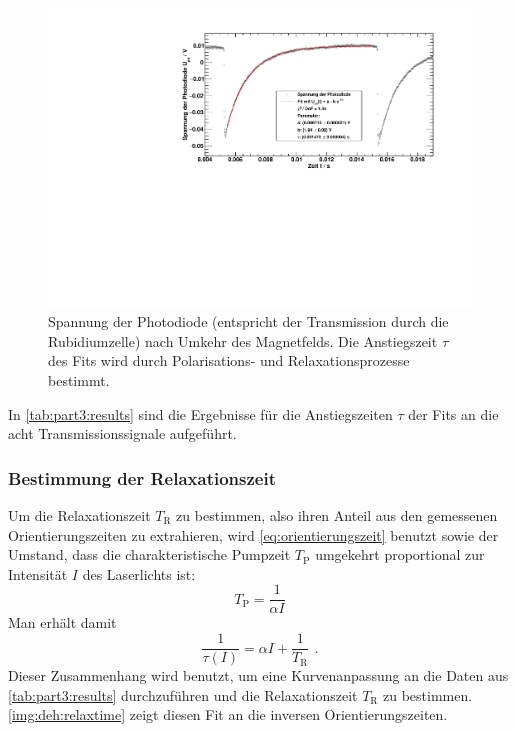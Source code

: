 \begin{figure}[H]
\begin{center}
  \includegraphics[width=\textwidth]{../img/part5/65-5mA-10.pdf}
  \caption{Spannung der Photodiode (entspricht der Transmission durch die Rubidiumzelle)
  nach Umkehr des Magnetfelds.
  Die Anstiegszeit $\tau$ des Fits wird durch Polarisations- und Relaxationsprozesse bestimmt.}
  \label{img:deh:trans3}
\end{center}
\end{figure}


In \autoref{tab:part3:results} sind die Ergebnisse für die Anstiegszeiten $\tau$
der Fits an die acht Transmissionssignale aufgeführt.




\subsubsection*{Bestimmung der Relaxationszeit}
Um die Relaxationszeit $T_\text{R}$ zu bestimmen, also ihren Anteil aus den gemessenen Orientierungszeiten zu extrahieren,
wird \autoref{eq:orientierungszeit} benutzt sowie der Umstand,
dass die charakteristische Pumpzeit $T_\text{P}$ umgekehrt proportional zur Intensität $I$ des Laserlichts ist:
\begin{equation}
  T_\text{P} = \frac{1}{\alpha I} 
\end{equation}
Man erhält damit
\begin{equation}
  \frac{1}{\tau(I)}=\alpha I + \frac{1}{T_\text{R}} \ \,.
\end{equation}
Dieser Zusammenhang wird benutzt, um eine Kurvenanpassung an die Daten aus \autoref{tab:part3:results}
durchzuführen und die Relaxationszeit $T_\text{R}$ zu bestimmen.
\autoref{img:deh:relaxtime} zeigt diesen Fit an die inversen Orientierungszeiten.

